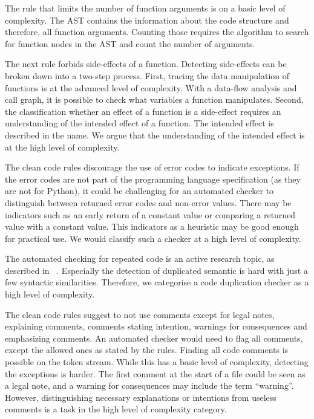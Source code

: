 The rule that limits the number of function arguments is on a basic level of complexity. The AST contains the information about the code structure and therefore, all function arguments. Counting those requires the algorithm to search for function nodes in the AST and count the number of arguments.

The next rule forbids side-effects of a function. Detecting side-effects can be broken down into a two-step process.
First, tracing the data manipulation of functions is at the advanced level of complexity. With a data-flow analysis and call graph, it is possible to check what variables a function manipulates. Second, the classification whether an effect of a function is a side-effect requires an understanding of the intended effect of a function. The intended effect is described in the name. We argue that the understanding of the intended effect is at the high level of complexity. 

The clean code rules discourage the use of error codes to indicate exceptions. If the error codes are not part of the programming language specification (as they are not for Python), it could be challenging for an automated checker to distinguish between returned error codes and non-error values. There may be indicators such as an early return of a constant value or comparing a returned value with a constant value. This indicators as a heuristic may be good enough for practical use. We would classify such a checker at a high level of complexity. 

The automated checking for repeated code is an active research topic, as described in ~\cite{buch_learning-based_2019,saini_oreo_2018}. Especially the detection of duplicated semantic is hard with just a few syntactic similarities. Therefore, we categorise a code duplication checker as a high level of complexity.

The clean code rules suggest to not use comments except for legal notes, explaining comments, comments stating intention, warnings for consequences and emphasizing comments. An automated checker would need to flag all comments, except the allowed ones as stated by the rules. Finding all code comments is possible on the token stream. While this has a basic level of complexity, detecting the exceptions is harder. The first comment at the start of a file could be seen as a legal note, and a warning for consequences may include the term \enquote{warning}. However, distinguishing necessary explanations or intentions from useless comments is a task in the high level of complexity category.


